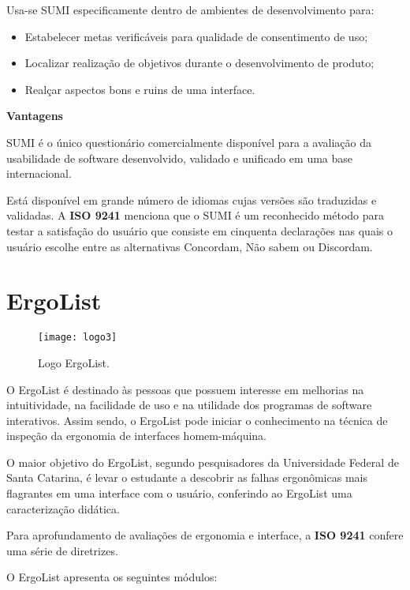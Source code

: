 		Usa-se SUMI especificamente dentro de ambientes de desenvolvimento para:

		\begin{itemize}
			\item{Estabelecer metas verificáveis para qualidade de consentimento de uso;}
			\item{Localizar realização de objetivos durante o desenvolvimento de produto;}
			\item{Realçar aspectos bons e ruins de uma interface.}
		\end{itemize}

		\textbf{Vantagens}

		SUMI é o único questionário comercialmente disponível para a avaliação da usabilidade de software desenvolvido, validado e unificado em uma base internacional. 

		Está disponível em grande número de idiomas cujas versões são traduzidas e validadas. A \textbf{ISO 9241} menciona que o SUMI é um reconhecido método para testar a satisfação do usuário que consiste em cinquenta declarações nas quais o usuário escolhe entre as alternativas Concordam, Não sabem ou Discordam. \cite{iso}

	\section[ErgoList]{ErgoList}
	\label{sec:questionarios_ErgoList}

		\begin{figure}[h]
			\centering
			\texttt{[image: logo3]}
			\caption[Logo ErgoList]{Logo ErgoList.\cite{ergoList}}
			\label{fig:logo2}
		\end{figure}

		O ErgoList é destinado às pessoas que possuem interesse em melhorias na intuitividade, na facilidade de uso e na utilidade dos programas de software interativos. Assim sendo, o ErgoList pode iniciar o conhecimento na técnica de inspeção da ergonomia de interfaces homem-máquina.
		
		O maior objetivo do ErgoList, segundo pesquisadores da Universidade Federal de Santa Catarina, é levar o estudante a descobrir as falhas ergonômicas mais flagrantes em uma interface com o usuário, conferindo ao ErgoList uma caracterização didática.
		
		Para aprofundamento de avaliações de ergonomia e interface, a \textbf{ISO 9241} confere uma série de diretrizes. \cite{iso}

		O ErgoList apresenta os seguintes módulos: 

